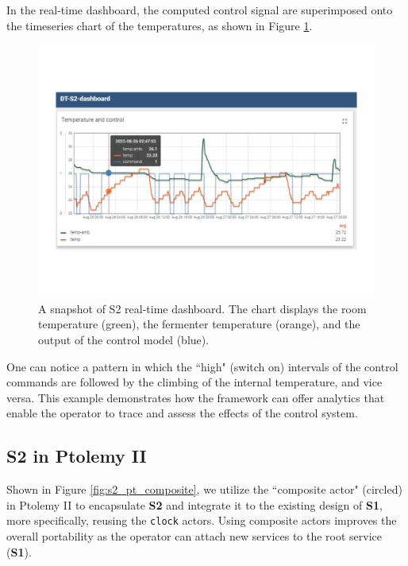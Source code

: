 In the real-time dashboard, the computed control signal are superimposed onto the timeseries chart of the temperatures, as shown in Figure \ref{fig:s2_tb_dashboard}. 

\begin{figure}[!htb]
  \centering
  \includegraphics[scale=0.44]{figures/s2_tb_dashboard.pdf}
  \caption[A snapshot of S2 real-time dashboard]{A snapshot of S2 real-time dashboard. The chart displays the room temperature (green), the fermenter temperature (orange), and the output of the control model (blue).}
  \label{fig:s2_tb_dashboard}
\end{figure}

One can notice a pattern in which the ``high" (switch on) intervals of the control commands are followed by the climbing of the internal temperature, and vice versa. This example demonstrates how the framework can offer analytics that enable the operator to trace and assess the effects of the control system.
 
\subsection{S2 in Ptolemy II} 
Shown in Figure \ref{fig:s2_pt_composite}, we utilize the ``composite actor" (circled) in Ptolemy II to encapsulate \textbf{S2} and integrate it to the existing design of \textbf{S1}, more specifically, reusing the \texttt{clock} actors. Using composite actors improves the overall portability as the operator can attach new services to the root service (\textbf{S1}).

